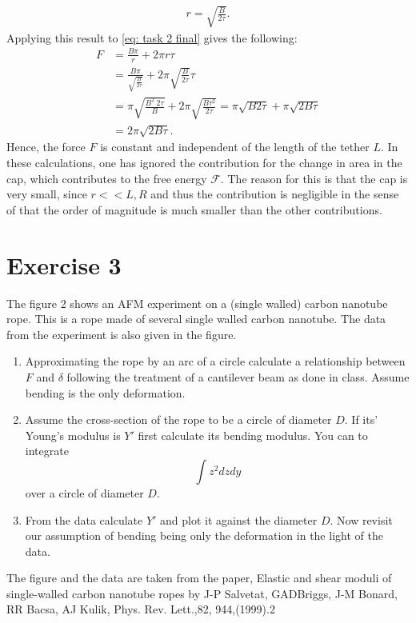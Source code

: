 \documentclass[a4paper]{article}
\newcommand{\F}{\mathcal{F}}
\begin{document}
\begin{align*}
    r = \sqrt{\frac{B}{2\tau}}.
\end{align*}Applying this result to \eqref{eq: task 2 final} gives the following:
\begin{align*}
    F &= \frac{B\pi}{r} + 2\pi r \tau\\
    &= \frac{B\pi}{\sqrt{\frac{B}{2\tau}}} + 2\pi \sqrt{\frac{B}{2\tau}}\tau\\
    &= \pi\sqrt{\frac{B^2\ 2\tau}{B}} +2\pi\sqrt{\frac{B\tau^2}{2\tau}} = \pi\sqrt{B2\tau} + \pi\sqrt{2B\tau}\\
    &= 2\pi\sqrt{2B\tau}.
\end{align*}Hence, the force $F$ is constant and independent of the length of the tether $L$. In these calculations, one has ignored the contribution for the change in area in the cap, which contributes to the free energy $\F$.
The reason for this is that the cap is very small, since $r<<L,R$ and thus the contribution is negligible in the sense of that the order of magnitude is much smaller than the other contributions.


\section*{Exercise 3}
The figure 2 shows an AFM experiment on a (single walled) carbon nanotube rope.
This is a rope made of several single walled carbon nanotube. The data from the experiment is also given in the figure.
\begin{enumerate}
    \item Approximating the rope by an arc of a circle calculate a relationship between $F$ and $\delta$ following the treatment of a cantilever beam as done in class.  Assume bending is the only deformation.
    \item Assume the cross-section of the rope to be a circle of diameter $D$. If its' Young's modulus is $Y'$ first calculate its bending modulus. You can to integrate $$\int z^2 dzdy$$ over a circle of diameter $D$.
    \item From the data calculate $Y'$ and plot it against the diameter $D$. Now revisit our assumption of bending being only the deformation in the light of the data.
\end{enumerate}
The figure and the data are taken from the paper, Elastic and shear moduli of single-walled carbon nanotube ropes by J-P Salvetat, GADBriggs, J-M Bonard, RR Bacsa, AJ Kulik, Phys. Rev. Lett.,82, 944,(1999).2
\end{document}
